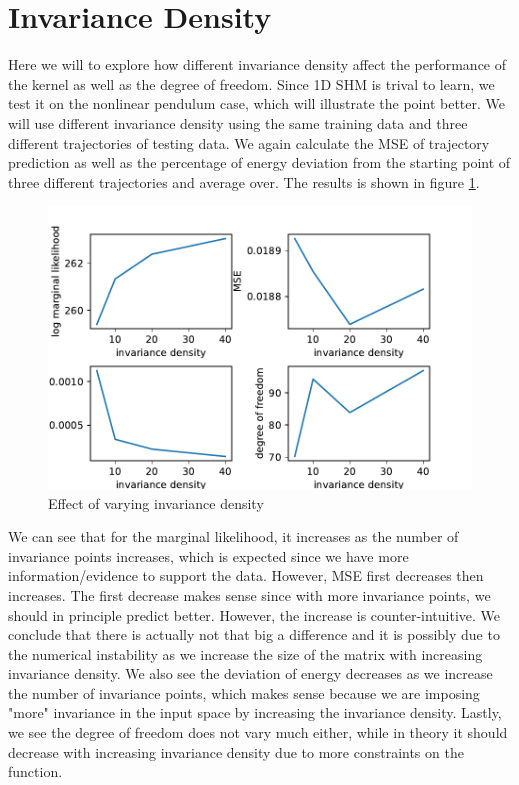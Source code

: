 \documentclass{statsmsc}
\begin{document}
\section{Invariance Density}
Here we will to explore how different invariance density affect the performance of the kernel as well as the degree of freedom.
Since 1D SHM is trival to learn, we test it on the nonlinear pendulum case, which will illustrate the point better. 
We will use different invariance density using the same training data and three different trajectories of testing data.
We again calculate the MSE of trajectory prediction as well as the percentage of energy deviation from the starting point of three different trajectories and average over.
The results is shown in figure \ref{fig:vary_invariance_density}.

\begin{figure}[H] 
  \includegraphics[width=\linewidth]{../codes/figures/vary_invariance.pdf}
  \centering
  \caption{Effect of varying invariance density}
  \label{fig:vary_invariance_density}
\end{figure}

We can see that for the marginal likelihood, it increases as the number of invariance points increases, which is expected since we have more information/evidence to support the data.
However, MSE first decreases then increases.
The first decrease makes sense since with more invariance points, we should in principle predict better.
However, the increase is counter-intuitive.
We conclude that there is actually not that big a difference and it is possibly due to the numerical instability as we increase the size of the matrix with increasing invariance density.  
We also see the deviation of energy decreases as we increase the number of invariance points, which makes sense because we are imposing "more" invariance in the input space by increasing the invariance density.
Lastly, we see the degree of freedom does not vary much either, while in theory it should decrease with increasing invariance density due to more constraints on the function.
\end{document}

